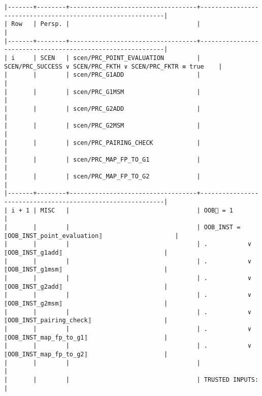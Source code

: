 \documentclass[varwidth=\maxdimen,margin=0.5cm,multi={verbatim}]{standalone}
\begin{document}
\begin{verbatim}
|-------+--------+-----------------------------------+------------------------------------------------------------|
| Row   | Persp. |                                   |                                                            |
|-------+--------+-----------------------------------+------------------------------------------------------------|
| i     | SCEN   | scen/PRC_POINT_EVALUATION         | SCEN/PRC_SUCCESS ∨ SCEN/PRC_FKTH ∨ SCEN/PRC_FKTR ≡ true    |
|       |        | scen/PRC_G1ADD                    |                                                            |
|       |        | scen/PRC_G1MSM                    |                                                            |
|       |        | scen/PRC_G2ADD                    |                                                            |
|       |        | scen/PRC_G2MSM                    |                                                            |
|       |        | scen/PRC_PAIRING_CHECK            |                                                            |
|       |        | scen/PRC_MAP_FP_TO_G1             |                                                            |
|       |        | scen/PRC_MAP_FP_TO_G2             |                                                            |
|-------+--------+-----------------------------------+------------------------------------------------------------|
| i + 1 | MISC   |                                   | OOB🚩 = 1                                                  |
|       |        |                                   | OOB_INST =  ⟦OOB_INST_point_evaluation⟧                    |
|       |        |                                   | .           ∨  ⟦OOB_INST_g1add⟧                            |
|       |        |                                   | .           ∨  ⟦OOB_INST_g1msm⟧                            |
|       |        |                                   | .           ∨  ⟦OOB_INST_g2add⟧                            |
|       |        |                                   | .           ∨  ⟦OOB_INST_g2msm⟧                            |
|       |        |                                   | .           ∨  ⟦OOB_INST_pairing_check⟧                    |
|       |        |                                   | .           ∨  ⟦OOB_INST_map_fp_to_g1⟧                     |
|       |        |                                   | .           ∨  ⟦OOB_INST_map_fp_to_g2⟧                     |
|       |        |                                   |                                                            |
|       |        |                                   | TRUSTED INPUTS:                                            |

\end{verbatim}
\end{document}
